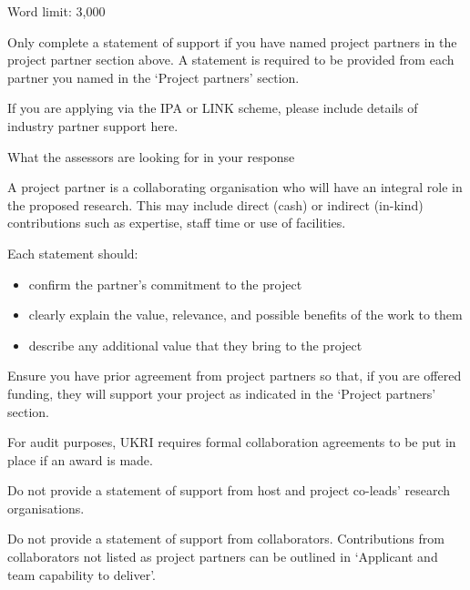 \begin{instruction}

Word limit: 3,000

Only complete a statement of support if you have named project partners in the
project partner section above. A statement is required to be provided from each
partner you named in the ‘Project partners’ section.

If you are applying via the IPA or LINK scheme, please include details of
industry partner support here.

What the assessors are looking for in your response

A project partner is a collaborating organisation who will have an integral
role in
the proposed research. This may include direct (cash) or indirect (in-kind)
contributions such as expertise, staff time or use of facilities.

Each statement should:

\begin{itemize}

    \item confirm the partner’s commitment to the project

    \item clearly explain the value, relevance, and possible benefits of the
    work to them

    \item describe any additional value that they bring to the project

\end{itemize}

Ensure you have prior agreement from project partners so that, if you are
offered funding, they will support your project as indicated in the ‘Project
partners’ section.

For audit purposes, UKRI requires formal collaboration agreements to be put in
place if an award is made.

Do not provide a statement of support from host and project co-leads’ research
organisations.

Do not provide a statement of support from collaborators. Contributions from
collaborators not listed as project partners can be outlined in ‘Applicant and
team capability to deliver’.

\end{instruction}
